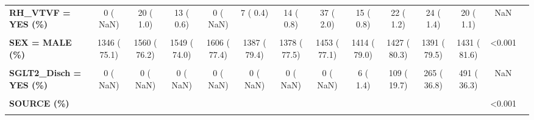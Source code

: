 \documentclass[
]{article}
\begin{document}
\begin{table}[H]
\begin{tabular}[t]{>{\raggedright\arraybackslash}p{5em}ccccccccccccc}
\textbf{RH\_VTVF = YES (\%)} & 0 (  NaN) & 20 (  1.0) & 13 (  0.6) & 0 (  NaN) & 7 (  0.4) & 14 (  0.8) & 37 (  2.0) & 15 (  0.8) & 22 (  1.2) & 24 (  1.4) & 20 (  1.1) & NaN & \\
\textbf{\cellcolor{gray!10}{S21BECG = YES (\%)}} & \cellcolor{gray!10}{0 (  NaN)} & \cellcolor{gray!10}{0 (  NaN)} & \cellcolor{gray!10}{0 (  NaN)} & \cellcolor{gray!10}{0 (  NaN)} & \cellcolor{gray!10}{0 (  NaN)} & \cellcolor{gray!10}{0 (  NaN)} & \cellcolor{gray!10}{0 (  NaN)} & \cellcolor{gray!10}{0 (  NaN)} & \cellcolor{gray!10}{0 (  NaN)} & \cellcolor{gray!10}{1319 ( 77.1)} & \cellcolor{gray!10}{0 (  NaN)} & \cellcolor{gray!10}{NaN} & \cellcolor{gray!10}{}\\
\textbf{SEX = MALE (\%)} & 1346 ( 75.1) & 1560 ( 76.2) & 1549 ( 74.0) & 1606 ( 77.4) & 1387 ( 79.4) & 1378 ( 77.5) & 1453 ( 77.1) & 1414 ( 79.0) & 1427 ( 80.3) & 1391 ( 79.5) & 1431 ( 81.6) & <0.001 & \\
\textbf{\cellcolor{gray!10}{SGLT2\_Chron = YES (\%)}} & \cellcolor{gray!10}{0 (  NaN)} & \cellcolor{gray!10}{0 (  NaN)} & \cellcolor{gray!10}{0 (  NaN)} & \cellcolor{gray!10}{0 (  NaN)} & \cellcolor{gray!10}{0 (  NaN)} & \cellcolor{gray!10}{0 (  NaN)} & \cellcolor{gray!10}{0 (  NaN)} & \cellcolor{gray!10}{6 (  1.0)} & \cellcolor{gray!10}{77 ( 14.2)} & \cellcolor{gray!10}{161 ( 21.7)} & \cellcolor{gray!10}{229 ( 18.8)} & \cellcolor{gray!10}{NaN} & \cellcolor{gray!10}{}\\
\textbf{SGLT2\_Disch = YES (\%)} & 0 (  NaN) & 0 (  NaN) & 0 (  NaN) & 0 (  NaN) & 0 (  NaN) & 0 (  NaN) & 0 (  NaN) & 6 (  1.4) & 109 ( 19.7) & 265 ( 36.8) & 491 ( 36.3) & NaN & \\
\textbf{\cellcolor{gray!10}{SGLT2\_Hosp = YES (\%)}} & \cellcolor{gray!10}{0 (  NaN)} & \cellcolor{gray!10}{0 (  NaN)} & \cellcolor{gray!10}{0 (  NaN)} & \cellcolor{gray!10}{0 (  NaN)} & \cellcolor{gray!10}{0 (  NaN)} & \cellcolor{gray!10}{0 (  NaN)} & \cellcolor{gray!10}{0 (  NaN)} & \cellcolor{gray!10}{1 (  0.2)} & \cellcolor{gray!10}{67 ( 12.1)} & \cellcolor{gray!10}{142 ( 19.2)} & \cellcolor{gray!10}{330 ( 26.9)} & \cellcolor{gray!10}{NaN} & \cellcolor{gray!10}{}\\
\textbf{SOURCE (\%)} &  &  &  &  &  &  &  &  &  &  &  & <0.001 & \\
\textbf{\cellcolor{gray!10}{S2000}} & \cellcolor{gray!10}{1793 (100.0)} & \cellcolor{gray!10}{0 (  0.0)} & \cellcolor{gray!10}{0 (  0.0)} & \cellcolor{gray!10}{0 (  0.0)} & \cellcolor{gray!10}{0 (  0.0)} & \cellcolor{gray!10}{0 (  0.0)} & \cellcolor{gray!10}{0 (  0.0)} & \cellcolor{gray!10}{0 (  0.0)} & \cellcolor{gray!10}{0 (  0.0)} & \cellcolor{gray!10}{0 (  0.0)} & \cellcolor{gray!10}{0 (  0.0)} & \cellcolor{gray!10}{} & \cellcolor{gray!10}{}\\

\end{tabular}
\end{table}
\end{document}

